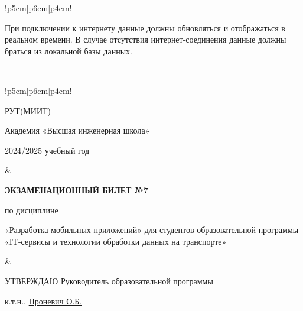 \documentclass[a4paper]{article}
\begin{document}
\begin{tabular}{!{\vrule width 2pt}p{5cm}|p{6cm}|p{4cm}!{\vrule width 2pt}}
{\begin{minipage}{16cm}
\begin{enumerate}
При подключении к интернету данные должны обновляться и отображаться в реальном времени.
В случае отсутствия интернет-соединения данные должны браться из локальной базы данных.
\end{enumerate}

\vspace{0.2cm}
    
\end{minipage}
}
\\
\end{tabular}

\newpage


\begin{tabular}{!{\vrule width 2pt}p{5cm}|p{6cm}|p{4cm}!{\vrule width 2pt}}

    {\centering 
    \fontsize{14pt}{16pt}\selectfont
    РУТ(МИИТ)

\vspace{14pt}

Академия «Высшая инженерная школа»

\vspace{14pt}

2024/2025 учебный год

    }
&
{
    \centering
\fontsize{14pt}{16pt}\selectfont

\textbf{ЭКЗАМЕНАЦИОННЫЙ
БИЛЕТ №7}


по дисциплине 

«Разработка мобильных приложений» 
\fontsize{12pt}{14pt}\selectfont
для студентов образовательной программы «IT-сервисы и технологии обработки данных на транспорте»

}
&
{
\centering
\fontsize{14pt}{16pt}\selectfont

УТВЕРЖДАЮ
Руководитель образовательной программы

\vspace{1cm}

\fontsize{12pt}{14pt}\selectfont
\underline{\hspace{3cm}}

к.т.н., \underline{Проневич О.Б.}

}
\\
\hline
{}
\end{tabular}
\end{document}
